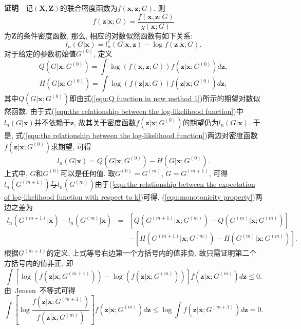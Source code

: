 \documentclass[a4paper,12pt,openany,oneside,utf-8]{ctexbook}
\newcommand{\xiaosihao}{\fontsize{12pt}{\baselineskip}\selectfont}
\begin{document}
\textbf{\xiaosihao 证明}~~记$(\bm{X}, \bm{Z})$的联合密度函数为$f(\bm{x}, \bm{z}; G)$, 则
\begin{equation*}
  f(\bm{z}|\bm{x}; G)=\frac{f(\bm{x}, \bm{z}; G)}{g(\bm{x}; G)}
\end{equation*}
为$\bm{Z}$的条件密度函数, 那么, 相应的对数似然函数有如下关系:
\begin{equation}
\label{equ:the relationship between the log-likelihood function}
  l_{n}(G|\bm{x}) = l_{n}^{c}(G|\bm{x}, \bm{z}) - \log f(\bm{z}|\bm{x}; G).
\end{equation}
对于给定的参数初始值$G^{(0)}$, 定义
\begin{equation*}
  Q(G|\bm{x}; G^{(0)}) = \int \log(f(\bm{x}, \bm{z}; G)) f(\bm{z}|\bm{x}; G^{(0)}) d\bm{z},
\end{equation*}
\begin{equation*}
  H(G|\bm{x}; G^{(0)}) = \int \log(f(\bm{z}|\bm{x}; G)) f(\bm{z}|\bm{x}; G^{(0)}) d\bm{z},
\end{equation*}
其中$Q(G|\bm{x}; G^{(0)})$即由式(\ref{equ:Q function in new method 1})所示的期望对数似然函数. 由于式(\ref{equ:the relationship between the log-likelihood function})中$l_{n}(G|\bm{x})$并不依赖于$\bm{z}$, 故其关于密度函数$f(\bm{z}|\bm{x}; G^{(0)})$的期望仍为$l_{n}(G|\bm{x})$. 于是, 式(\ref{equ:the relationship between the log-likelihood function})两边对密度函数$f(\bm{z}|\bm{x}; G^{(0)})$求期望, 可得
\begin{equation}
\label{equ:the relationship between the expectation of log-likelihood function with respect to k}
  l_{n}(G|\bm{x}) = Q(G|\bm{x}; G^{(0)}) - H(G|\bm{x}; G^{(0)}).
\end{equation}
上式中, $G$和$G^{(0)}$可以是任何值. 取$G^{(0)}=G^{(m)}$, $G=G^{(m+1)}$, 可得$l_{n}(G^{(m+1)})$与$l_{n}(G^{(m)})$由于(\ref{equ:the relationship between the expectation of log-likelihood function with respect to k})可得, (\ref{equ:monotonicity property})两边之差为
\begin{eqnarray*}
  l_{n}(G^{(m+1)}|\bm{x}) - l_{n}(G^{(m)}|\bm{x}) &=& [Q(G^{(m+1)}|\bm{x}; G^{(m)}) - Q(G^{(m)}|\bm{x}; G^{(m)})]\nonumber\\
                                                                             && - [H(G^{(m+1)}|\bm{x}; G^{(m)}) - H(G^{(m)}|\bm{x}; G^{(m)})].
\end{eqnarray*}
根据$G^{(m+1)}$的定义, 上式等号右边第一个方括号内的值非负, 故只需证明第二个方括号内的值非正, 即
\begin{equation*}
  \int [\log(f(\bm{z}|\bm{x}; G^{(m+1)})) - \log(f(\bm{z}|\bm{x}; G^{(m)}))] f(\bm{z}|\bm{x}; G^{(m)}) d\bm{z} \leq 0.
\end{equation*}
由~Jensen~不等式可得
\begin{equation*}
  \int [\log \frac{f(\bm{z}|\bm{x}; G^{(m+1)})}{f(\bm{z}|\bm{x}; G^{(m)})}] f(\bm{z}|\bm{x}; G^{(m)}) d\bm{z}
  \leq \log \int f(\bm{z}|\bm{x}; G^{(m+1)}) d\bm{z}
  =0.
\end{equation*}
\end{document}
